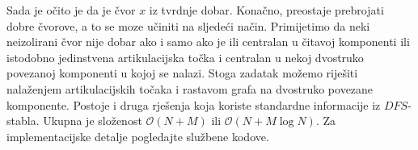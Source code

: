Sada je očito je da je čvor $x$ iz tvrdnje dobar. Konačno, preostaje prebrojati dobre čvorove, a to se moze učiniti na sljedeći način. \iffalse Promotrimo tzv. \textit{block-cut tree} $T$ neke komponente (koja bez smanjenja općenitosti nije izolirani čvor), odnosno stablo čiji vrhovi odgovaraju artikulacijskim točkama i dvostruko povezanim komponentama, pri čemu je neka artikulacijska točka povezana s nekom dvostruko povezanom komponentom ako se nalazi u njoj. \fi Primijetimo da neki neizolirani čvor nije dobar ako i samo ako je ili centralan u čitavoj komponenti ili istodobno jedinstvena artikulacijska točka i centralan u nekoj dvostruko povezanoj komponenti u kojoj se nalazi. Stoga zadatak možemo riješiti nalaženjem artikulacijskih točaka i rastavom grafa na dvostruko povezane komponente. Postoje i druga rješenja koja koriste standardne informacije iz $DFS$-stabla. Ukupna je složenost $\mathcal{O}(N + M)$ ili $\mathcal{O}(N + M\log N)$. Za implementacijske detalje pogledajte službene kodove.

